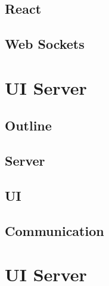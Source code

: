 \documentclass{article}
\begin{document}
	\subsection{React}
	\subsection{Web Sockets}
	
\section{UI Server}
	\subsection{Outline}
	\subsection{Server}
	\subsection{UI} 
	\subsection{Communication}
	
		
\section{UI Server}
\end{document}
